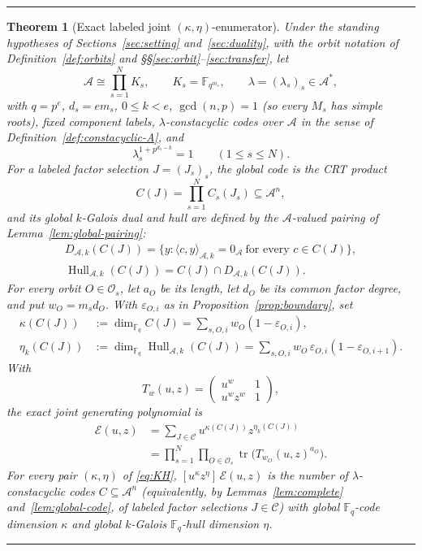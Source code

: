 \documentclass[10pt,a4paper]{article}
\newcommand{\F}{\mathbb F}
\newcommand{\A}{\mathcal A}
\newcommand{\Os}{\mathcal O_s}
\newcommand{\Epoly}{\mathscr E}
\newcommand{\Hull}{\operatorname{Hull}}
\numberwithin{equation}{section}
\theoremstyle{plain}
\newtheorem{theorem}{Theorem}[section]
\theoremstyle{definition}
\theoremstyle{remark}
\newenvironment{keyresult}
  {\par\addvspace{3pt}\noindent\rule{\linewidth}{0.4pt}\par\nobreak\addvspace{3pt}}
  {\par\nobreak\addvspace{3pt}\noindent\rule{\linewidth}{0.4pt}\par\addvspace{3pt}}
\begin{document}
\begin{keyresult}
\begin{theorem}[Exact labeled joint $(\kappa,\eta)$-enumerator]\label{thm:central}
Under the standing hypotheses of Sections~\ref{sec:setting} and~\ref{sec:duality},
with the orbit notation of Definition~\ref{def:orbits} and
\S\S\ref{sec:orbit}--\ref{sec:transfer}, let
\[
\A\cong\prod_{s=1}^{N}K_s,\qquad K_s=\F_{q^{m_s}},\qquad
\lambda=(\lambda_s)_s\in\A^{*},
\]
with $q=p^{e}$, $d_s=em_s$, $0\le k<e$, $\gcd(n,p)=1$ (so every $M_s$ has simple
roots), fixed component labels, $\lambda$-constacyclic codes over $\A$ in the
sense of Definition~\ref{def:constacyclic-A}, and
\[
\lambda_s^{1+p^{d_s-k}}=1\qquad(1\le s\le N).
\]
For a labeled factor selection $J=(J_s)_s$, the global code is the CRT product
\[
C(J)=\prod_{s=1}^{N}C_s(J_s)\subseteq\A^{n},
\]
and its global $k$-Galois dual and hull are defined by the $\A$-valued pairing of
Lemma~\ref{lem:global-pairing}:
\[
\begin{gathered}
D_{\A,k}(C(J))=\{y:\langle c,y\rangle_{\A,k}=0_{\A}\ \text{for every } c\in C(J)\},
\\
\Hull_{\A,k}(C(J))=C(J)\cap D_{\A,k}(C(J)).
\end{gathered}
\]
For every orbit $O\in\Os$, let $a_O$ be its length, let $d_O$ be its common factor
degree, and put $w_O=m_sd_O$. With $\varepsilon_{O,i}$ as in
Proposition~\ref{prop:boundary}, set
\begin{equation}\label{eq:KH}
\begin{aligned}
\kappa(C(J)) &:= \dim_{\F_q}C(J)
 =\sum_{s,O,i}w_O(1-\varepsilon_{O,i}),\\
\eta_k(C(J)) &:= \dim_{\F_q}\Hull_{\A,k}(C(J))
 =\sum_{s,O,i}w_O\,\varepsilon_{O,i}(1-\varepsilon_{O,i+1}).
\end{aligned}
\end{equation}
With
\[
T_w(u,z)=\begin{pmatrix}u^{w}&1\\ u^{w}z^{w}&1\end{pmatrix},
\]
the exact joint generating polynomial is
\begin{equation}\label{eq:joint}
\begin{aligned}
\Epoly(u,z)
 &=\sum_{J\in\mathscr C}u^{\kappa(C(J))}z^{\eta_k(C(J))}\\
 &=\prod_{s=1}^{N}\prod_{O\in\Os}
 \operatorname{tr}\bigl(T_{w_O}(u,z)^{a_O}\bigr).
\end{aligned}
\end{equation}
For every pair $(\kappa,\eta)$ of \eqref{eq:KH}, $[u^{\kappa}z^{\eta}]\,\Epoly(u,z)$
is the number of $\lambda$-constacyclic codes $C\subseteq\A^{n}$ (equivalently, by
Lemmas~\ref{lem:complete} and~\ref{lem:global-code}, of labeled factor selections
$J\in\mathscr C$) with global $\F_q$-code dimension $\kappa$ and global
$k$-Galois $\F_q$-hull dimension $\eta$.
\end{theorem}
\end{keyresult}
\end{document}
